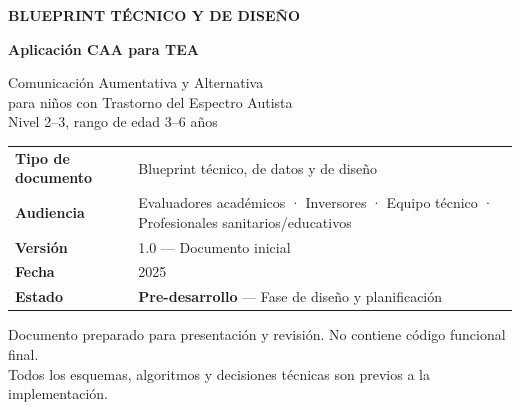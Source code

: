 \documentclass[12pt, a4paper]{article}
\begin{document}
\begin{titlepage}
\thispagestyle{empty}

\vspace*{1.8cm}
{\color{white}\fontsize{11}{14}\selectfont\textbf{BLUEPRINT TÉCNICO Y DE DISEÑO}}

\vspace{0.4cm}
{\color{white}\fontsize{24}{30}\selectfont\textbf{Aplicación CAA para TEA}}

\vspace{0.3cm}
{\color{white!80!primario}\fontsize{14}{18}\selectfont
Comunicación Aumentativa y Alternativa\\
para niños con Trastorno del Espectro Autista\\
Nivel 2--3, rango de edad 3--6 años}

\vspace{2.5cm}

\begin{tcolorbox}[colback=white, colframe=grisMedio, arc=8pt,
  boxrule=0.5pt, left=16pt, right=16pt, top=12pt, bottom=12pt,
  width=\textwidth]
\begin{tabular}{L{4cm} L{9cm}}
\textcolor{gris}{\small\textbf{Tipo de documento}} &
  \small Blueprint técnico, de datos y de diseño \\[4pt]
\textcolor{gris}{\small\textbf{Audiencia}} &
  \small Evaluadores académicos · Inversores · Equipo técnico · Profesionales sanitarios/educativos \\[4pt]
\textcolor{gris}{\small\textbf{Versión}} &
  \small 1.0 --- Documento inicial \\[4pt]
\textcolor{gris}{\small\textbf{Fecha}} &
  \small 2025 \\[4pt]
\textcolor{gris}{\small\textbf{Estado}} &
  \small \textcolor{acento}{\textbf{Pre-desarrollo}} --- Fase de diseño y planificación \\
\end{tabular}
\end{tcolorbox}

\vfill

{\small\textcolor{gris}{Documento preparado para presentación y revisión. No contiene código funcional final.\\
Todos los esquemas, algoritmos y decisiones técnicas son previos a la implementación.}}

\end{titlepage}
\end{document}
